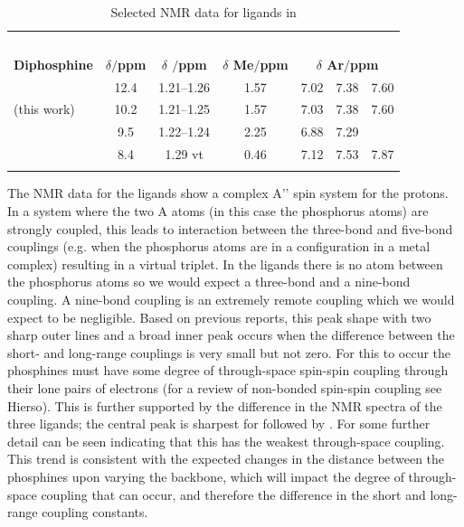 \begin{table}[ht]
\small
\caption[Selected NMR data for \tBuxantphos{} ligands]{Selected NMR data for \tBuxantphos{} ligands in }
\label{table:ligandNMRdata}
\begin{center}
\begin{tabular}{l c c c c c c}
	\toprule
	~ & \bfseries{\phosphorus} & \multicolumn{5}{c}{\bfseries{\proton}} \\
	\cmidrule(lr){2-2} \cmidrule(lr){3-7}
	\bfseries{Diphosphine} & \bfseries{$\delta/$ppm} & \bfseries{$\delta$ \ce{^{t}Bu}$/$ppm} & \bfseries{$\delta$ Me$/$ppm} & \multicolumn{3}{c}{\bfseries{$\delta$ Ar$/$ppm}} \\
	\midrule
	\tBuXantphos\cite{Mispelaere2005}	& 12.4 & 1.21--1.26 & 1.57 & 7.02 & 7.38 & 7.60 \\
	\tBuXantphos{} (this work) 		& 10.2 & 1.21--1.25 & 1.57 & 7.03 & 7.38 & 7.60 \\
	\tBuThixantphos				& 9.5 & 1.22--1.24 & 2.25 & 6.88 & 7.29 & \\
	\tBuSixantphos					& 8.4 & 1.29 vt & 0.46 & 7.12 & 7.53 & 7.87\\ 
	\bottomrule{}
\end{tabular}
\end{center}
\end{table}

The \proton{} NMR data for the \tBuxantphos{} ligands show a complex A'' spin system for the \tBu{} protons. In a system where the two A atoms (in this case the phosphorus atoms) are strongly coupled, this leads to interaction between the three-bond and five-bond couplings (e.g. when the phosphorus atoms are in a \trans configuration in a metal complex) resulting in a virtual triplet.\cite{Harris1964}  In the \tBuxantphos{} ligands there is no atom between the phosphorus atoms so we would expect a three-bond and a nine-bond coupling.  A nine-bond coupling is an extremely remote coupling which we would expect to be negligible.  Based on previous reports,\cite{Harris1964, Abraham1961} this peak shape with two sharp outer lines and a broad inner peak occurs when the difference between the short- and long-range couplings is very small but not zero.  For this to occur the phosphines must have some degree of through-space spin-spin coupling through their lone pairs of electrons (for a review of non-bonded spin-spin coupling see Hierso\cite{Hierso2014}).  This is further supported by the difference in the \proton{} NMR spectra of the three ligands; the central peak is sharpest for \tBusixantphos{} followed by \tButhixantphos{}.  For \tBuxantphos{} some further detail can be seen indicating that this has the weakest through-space coupling.  This trend is consistent with the expected changes in the distance between the phosphines upon varying the backbone, which will impact the degree of through-space coupling that can occur, and therefore the difference in the short and long-range coupling constants.

